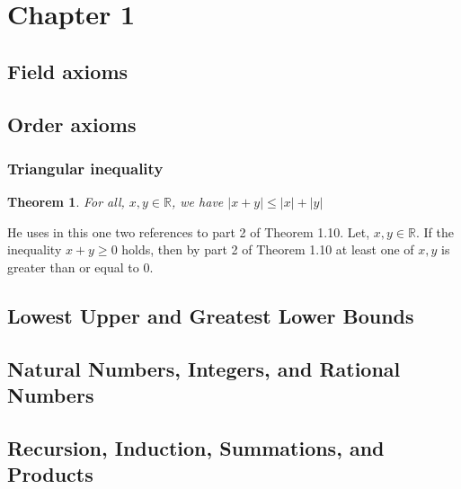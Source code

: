 \documentclass{article}
\newtheorem*{theorem}{Theorem}
\begin{document}
\section{Chapter 1}
\subsection{Field axioms}
\subsection{Order axioms}
\subsubsection{Triangular inequality}
\begin{theorem}
    For all, \(x, y \in \mathbb{R}\), we have \(|x + y| \leq |x| + |y|\)
\end{theorem}

He uses in this one two references to part 2 of Theorem 1.10. Let, \(x, y \in \mathbb{R}\). If the
inequality \(x + y \geq 0\) holds, then by part 2 of Theorem 1.10 at least one of \(x, y\) is greater than or equal to \(0\).

\subsection{Lowest Upper and Greatest Lower Bounds}
\subsection{Natural Numbers, Integers, and Rational Numbers}
\subsection{Recursion, Induction, Summations, and Products}
\end{document}
